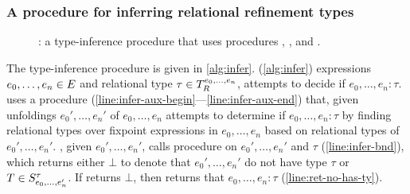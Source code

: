 \subsubsection{A procedure for inferring relational refinement types}
\label{sec:infer-alg}

\begin{figure}
  \centering
\begin{algorithm}[H]
  \caption{ \sys: a type-inference procedure that uses procedures
    \inferbnd, \chkinductive, and \unfoldexp. }
  \label{alg:infer}
\end{algorithm}
\end{figure}

The type-inference procedure \sys is given in \autoref{alg:infer}.
%
\sys (\autoref{alg:infer}) expressions $e_0, \ldots, e_n \in E$
and relational type $\tau \in T_{R}^{e_0, \ldots, e_n}$, attempts
to decide if $e_0, \ldots, e_n : \tau$.
%
\sys uses a procedure \inferaux
(\autoref{line:infer-aux-begin}---\autoref{line:infer-aux-end}) that,
given unfoldings $e_0', \ldots, e_n'$ of $e_0, \ldots, e_n$ attempts
to determine if $e_0, \ldots, e_n : \tau$ by finding relational types
over fixpoint expressions in $e_0, \ldots, e_n$ based on relational
types of $e_0', \ldots, e_n'$.
%
\sys, given $e_0', \ldots, e_n'$, calls procedure \inferbnd on
$e_0', \ldots, e_n'$ and $\tau$ (\autoref{line:infer-bnd}), which
returns either $\bot$ to denote that $e_0', \ldots, e_n'$ do not have
type $\tau$ or $T \in S_{ e_0, \ldots, e_n' }^{ \tau }$.
If \inferbnd returns $\bot$, then \sys returns that
$e_0, \ldots, e_n : \tau$ (\autoref{line:ret-no-has-ty}).

